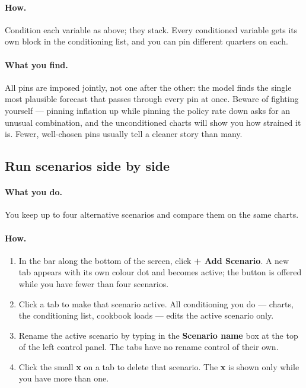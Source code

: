 \documentclass[11pt]{article}
\theoremstyle{definition}
\theoremstyle{remark}
\begin{document}
\paragraph{How.} Condition each variable as above; they stack. Every conditioned
variable gets its own block in the conditioning list, and you can pin different
quarters on each.

\paragraph{What you find.} All pins are imposed jointly, not one after the other:
the model finds the single most plausible forecast that passes through every pin at
once. Beware of fighting yourself --- pinning inflation up while pinning the policy
rate down asks for an unusual combination, and the unconditioned charts will show
you how strained it is. Fewer, well-chosen pins usually tell a cleaner story than
many.

\subsection{Run scenarios side by side}

\paragraph{What you do.} You keep up to four alternative scenarios and compare them
on the same charts.

\paragraph{How.}
\begin{enumerate}
  \item In the bar along the bottom of the screen, click \textbf{+ Add Scenario}.
    A new tab appears with its own colour dot and becomes active; the button is
    offered while you have fewer than four scenarios.
  \item Click a tab to make that scenario active. All conditioning you do --- charts,
    the conditioning list, cookbook loads --- edits the active scenario only.
  \item Rename the active scenario by typing in the \textbf{Scenario name} box at the
    top of the left control panel. The tabs have no rename control of their own.
  \item Click the small \textbf{x} on a tab to delete that scenario. The \textbf{x}
    is shown only while you have more than one.
\end{enumerate}
\end{document}
